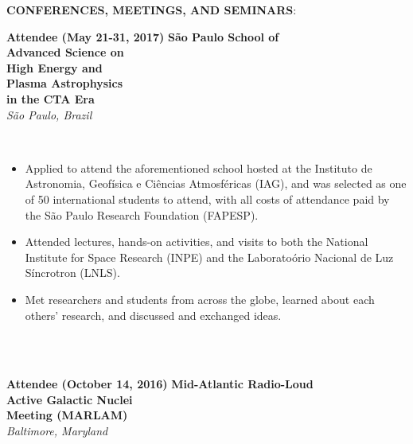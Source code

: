 \documentclass{article}
\begin{document}
\noindent \textbf{CONFERENCES, MEETINGS, AND SEMINARS}:\\
\begin{vwcol}[widths={0.8,0.2}, sep=.8cm, justify=flush, rule=0pt, indent=0em]
\noindent \textbf{Attendee (May 21-31, 2017)}
\newpage
\noindent \textbf{S\~{a}o Paulo School of}\\
\noindent \textbf{Advanced Science on}\\
\noindent \textbf{High Energy and}\\
\noindent \textbf{Plasma Astrophysics}\\
\noindent \textbf{in the CTA Era}\\
\noindent \emph{S\~{a}o Paulo, Brazil}
\end{vwcol}
\phantom \\
\begin{itemize}
\item Applied to attend the aforementioned school hosted at the Instituto de Astronomia, Geof\'{i}sica e Ci\^{e}ncias Atmosf\'{e}ricas (IAG), and was selected as one of 50 international students to attend, with all costs of attendance paid by the S\~{a}o Paulo Research Foundation (FAPESP).
\item Attended lectures, hands-on activities, and visits to both the National Institute for Space Research (INPE) and the Laborato\'{o}rio Nacional de Luz S\'{i}ncrotron (LNLS).
\item Met researchers and students from across the globe, learned about each others' research, and discussed and exchanged ideas.
\end{itemize}
\phantom \\
\phantom \\
%
%
%
%
\begin{vwcol}[widths={0.8,0.2}, sep=.8cm, justify=flush, rule=0pt, indent=0em]
\noindent \textbf{Attendee (October 14, 2016)}
\newpage
\noindent \textbf{Mid-Atlantic Radio-Loud}\\
\noindent \textbf{Active Galactic Nuclei}\\
\noindent \textbf{Meeting (MARLAM)}\\
\noindent \emph{Baltimore, Maryland}
\end{vwcol}
\end{document}
